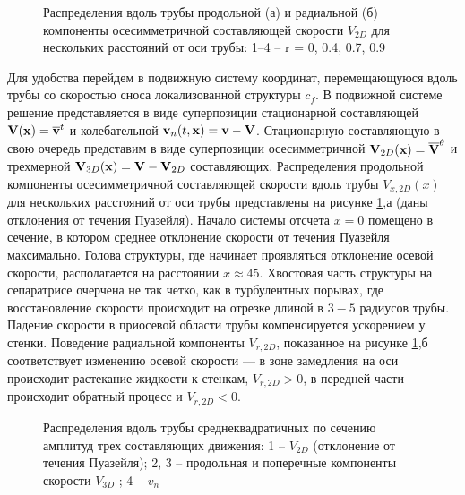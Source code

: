 \begin{figure}
\caption{Распределения вдоль трубы продольной (а) и радиальной (б) компоненты осесимметричной составляющей скорости $V_{2D}$ для нескольких расстояний от оси
трубы: 1–4 – r = 0, 0.4, 0.7, 0.9}
\label{U2D_pic}
\end{figure}

Для удобства перейдем в подвижную систему координат, перемещающуюся вдоль трубы со скоростью сноса локализованной структуры $c_f$. В подвижной системе решение представляется в виде суперпозиции стационарной составляющей $\mathbf{V}(\mathbf{x}) = \overline{\mathbf{v}}^t$ и колебательной $\mathbf{v}_n(t,\mathbf{x}) = \mathbf{v} - \mathbf{V}$. Стационарную составляющую в свою очередь представим в виде суперпозиции осесимметричной $\mathbf{V}_{2D}(\mathbf{x}) = \overline{\mathbf{V}}^{\theta}$ и трехмерной $\mathbf{V}_{3D}(\mathbf{x})=\mathbf{V} - \mathbf{V}_{2D}$ составляющих. Распределения продольной компоненты осесимметричной составляющей скорости вдоль трубы $V_{x,2D}(x)$ для нескольких расстояний от оси трубы представлены на рисунке \ref{U2D_pic},а (даны отклонения от течения Пуазейля). Начало системы отсчета $x=0$ помещено в сечение, в котором среднее отклонение скорости от течения Пуазейля максимально. Голова структуры, где начинает проявляться отклонение осевой скорости, располагается на расстоянии $x \approx 45$. Хвостовая часть структуры на сепаратрисе очерчена не так четко, как в турбулентных порывах, где восстановление скорости происходит на отрезке длиной в $3-5$ радиусов трубы.  Падение скорости в приосевой области трубы компенсируется ускорением у стенки. Поведение радиальной компоненты $V_{r,2D}$, показанное на рисунке \ref{U2D_pic},б соответствует изменению осевой скорости --- в зоне замедления на оси происходит растекание жидкости к стенкам, $V_{r,2D}>0$, в передней части происходит обратный процесс и $V_{r,2D}<0$.


\begin{figure}
\caption{Распределения вдоль трубы среднеквадратичных по сечению амплитуд трех
составляющих движения: 1 – $V_{2D}$ (отклонение от течения Пуазейля); 2, 3 – продольная и поперечные компоненты скорости $V_{3D}$ ; 4 – $v_{n}$}
\label{amp_pic}
\end{figure}


